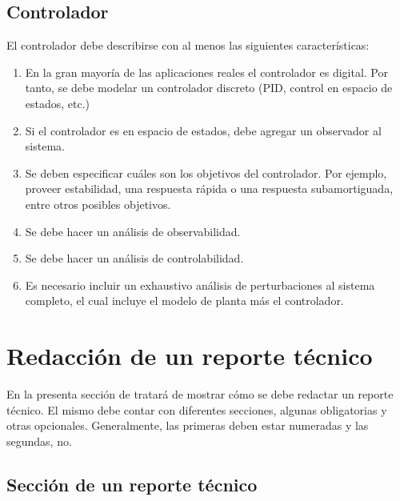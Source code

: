 \documentclass{article}
\begin{document}
\subsection{Controlador}
\label{sec:controlador}

El controlador debe describirse con al menos las siguientes características:

\begin{enumerate}

    \item En la gran mayoría de las aplicaciones reales el controlador es digital. Por tanto, se debe modelar un controlador discreto (PID, control en espacio de estados, etc.)

    \item Si el controlador es en espacio de estados, debe agregar un observador al sistema.

    \item Se deben especificar cuáles son los objetivos del controlador. Por ejemplo, proveer estabilidad, una respuesta rápida o una respuesta subamortiguada, entre otros posibles objetivos.

    \item Se debe hacer un análisis de observabilidad.

    \item Se debe hacer un análisis de controlabilidad.

    \item Es necesario incluir un exhaustivo análisis de perturbaciones al sistema completo, el cual incluye el modelo de planta más el controlador.

\end{enumerate}
\section{Redacción de un reporte técnico}
\label{sec:reporte-tecnico}

En la presenta sección de tratará de mostrar cómo se debe redactar un reporte técnico. El mismo debe contar con diferentes secciones, algunas obligatorias y otras opcionales. Generalmente, las primeras deben estar numeradas y las segundas, no.

\subsection{Sección de un reporte técnico}
\label{sec:secciones}
\end{document}
